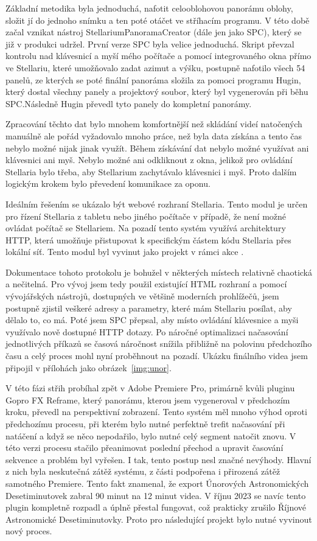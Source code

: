 \documentclass[12pt,a4paper,titlepage]{article}
\begin{document}
Základní metodika byla jednoduchá, nafotit celooblohovou panorámu oblohy, složit jí do jednoho snímku a ten poté otáčet ve stříhacím programu. V této době začal vznikat nástroj StellariumPanoramaCreator (dále jen jako SPC), který se již v produkci udržel. První verze SPC byla velice jednoduchá. Skript převzal kontrolu nad klávesnicí a myší mého počítače a pomocí integrovaného okna přímo ve Stellariu, které umožňovalo zadat azimut a výšku, postupně nafotilo všech 54 panelů, ze kterých se poté finální panoráma složila za pomoci programu Hugin, který dostal všechny panely a projektový soubor, který byl vygenerován při běhu SPC.\@ Následně Hugin převedl tyto panely do kompletní panorámy.

Zpracování těchto dat bylo mnohem komfortnější než skládání videí natočených manuálně ale pořád vyžadovalo mnoho práce, než byla data získána a tento čas nebylo možné nijak jinak využít. Během získávání dat nebylo možné využívat ani klávesnici ani myš. Nebylo možné ani odkliknout z okna, jelikož pro ovládání Stellaria bylo třeba, aby Stellarium zachytávalo klávesnici i myš. Proto dalším logickým krokem bylo převedení komunikace za oponu. 

Ideálním řešením se ukázalo být webové rozhraní Stellaria. Tento modul je určen pro řízení Stellaria z tabletu nebo jiného počítače v případě, že není možné ovládat počítač se Stellariem. Na pozadí tento systém využívá architektury HTTP, která umožňuje přistupovat k specifickým částem kódu Stellaria přes lokální síť. Tento modul byl vyvinut jako projekt v rámci akce . 

Dokumentace tohoto protokolu je bohužel v některých místech relativně chaotická a nečitelná. Pro vývoj jsem tedy použil existující HTML rozhraní a pomocí vývojářských nástrojů, dostupných ve většině moderních prohlížečů, jsem postupně zjistil veškeré adresy a parametry, které mám Stellariu posílat, aby dělalo to, co má. Poté jsem SPC přepsal, aby místo ovládání klávesnice a myši využívalo nově dostupné HTTP dotazy. Po náročné optimalizaci načasování jednotlivých příkazů se časová náročnost snížila přibližně na polovinu předchozího času a celý proces mohl nyní proběhnout na pozadí. Ukázku finálního videa jsem připojil v přílohách jako obrázek~\ref{img:unor}.

V této fázi střih probíhal zpět v Adobe Premiere Pro, primárně kvůli pluginu Gopro FX Reframe, který panorámu, kterou jsem vygeneroval v předchozím kroku, převedl na perspektivní zobrazení. Tento systém měl mnoho výhod oproti předchozímu procesu, při kterém bylo nutné perfektně trefit načasování při natáčení a když se něco nepodařilo, bylo nutné celý segment natočit znovu. V této verzi procesu stačilo přeanimovat poslední přechod a upravit časování sekvence a problém byl vyřešen. I tak, tento postup nesl značné nevýhody. Hlavní z nich byla neskutečná zátěž systému, z části podpořena i přirozená zátěž samotného Premiere. Tento fakt znamenal, že export Únorových Astronomických Desetiminutovek zabral 90 minut na 12 minut videa. V říjnu 2023 se navíc tento plugin kompletně rozpadl a úplně přestal fungovat, což prakticky zrušilo Říjnové Astronomické Desetiminutovky. Proto pro následující projekt bylo nutné vyvinout nový proces. 
\end{document}
